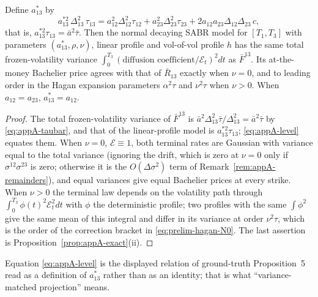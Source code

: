 \documentclass[../../main.tex]{subfiles}
\begin{document}
\begin{proposition}\label{prop:appA-level}
Define $a_{13}^*$ by
\begin{equation}\label{eq:appA-level}
a_{13}^{*2}\,\Delta_{13}^2\,\tau_{13}=a_{12}^2\Delta_{12}^2\tau_{12}+a_{23}^2\Delta_{23}^2\tau_{23}+2a_{12}a_{23}\Delta_{12}\Delta_{23}\,c ,
\end{equation}
that is, $a_{13}^{*2}\tau_{13}=\bar a^2\bar\tau$. Then the normal decaying SABR model for $[T_1,T_3]$ with parameters $(a_{13}^*,\rho,\nu)$, linear profile and vol-of-vol profile $h$ has the same total frozen-volatility variance $\int_0^{T_3}(\text{diffusion coefficient}/\mathcal E_t)^2dt$ as $\bar F^{13}$. Its at-the-money Bachelier price agrees with that of $\bar R_{13}$ exactly when $\nu=0$, and to leading order in the Hagan expansion parameters $\alpha^2\tau$ and $\nu^2\tau$ when $\nu>0$. When $a_{12}=a_{23}$, $a_{13}^*=a_{12}$.
\end{proposition}

\begin{proof}
The total frozen-volatility variance of $\bar F^{13}$ is $\bar a^2\Delta_{13}^2\bar\tau/\Delta_{13}^2=\bar a^2\bar\tau$ by \eqref{eq:appA-taubar}, and that of the linear-profile model is $a_{13}^{*2}\tau_{13}$; \eqref{eq:appA-level} equates them. When $\nu=0$, $\mathcal E\equiv1$, both terminal rates are Gaussian with variance equal to the total variance (ignoring the drift, which is zero at $\nu=0$ only if $\sigma^{12}\sigma^{23}$ is zero; otherwise it is the $O(\Delta\sigma^2)$ term of Remark~\ref{rem:appA-remainders}), and equal variances give equal Bachelier prices at every strike. When $\nu>0$ the terminal law depends on the volatility path through $\int_0^{T_3}\phi(t)^2\mathcal E_t^2dt$ with $\phi$ the deterministic profile; two profiles with the same $\int\phi^2$ give the same mean of this integral and differ in its variance at order $\nu^2\tau$, which is the order of the correction bracket in \eqref{eq:prelim-hagan-N0}. The last assertion is Proposition~\ref{prop:appA-exact}(ii).
\end{proof}

Equation \eqref{eq:appA-level} is the displayed relation of ground-truth Proposition~5 read as a definition of $a_{13}^*$ rather than as an identity; that is what ``variance-matched projection'' means.
\end{document}
